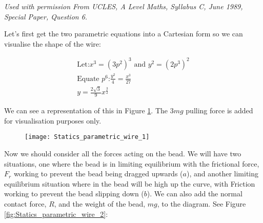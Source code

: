 
\begin{problem}[A1989MsQ6l] %
{
{\textit{Used with permission From UCLES, A Level Maths, Syllabus C, June 1989, Special Paper, Question 6.}}
{
Let's first get the two parametric equations into a Cartesian form so we can visualise the shape of the wire:

\begin{eqnarray*}
\text{Let:} x^3 = (3p^2)^3 \text{ and } y^2 = (2p^3)^2 \\
\text{Equate $p^6$:} \frac{y^2}{4} = \frac{x^3}{27} \\
y = \frac{2\sqrt{3}}{9}x^{\frac{3}{2}} 
\end{eqnarray*}

 We can see a representation of this in Figure \ref{fig:Statics_parametric_wire_1}. The $3mg$ pulling force is added for visualisation purposes only.
 
 \begin{figure}[h]
	\centering
	\texttt{[image: Statics\_parametric\_wire\_1]}
	\caption{}	
	\label{fig:Statics_parametric_wire_1}
\end{figure}

Now we should consider all the forces acting on the bead. We will have two situations, one where the bead is in limiting equilibrium with the frictional force, $F_r$ working to prevent the bead being dragged upwards ($a$), and another limiting equilibrium situation where in the bead will be high up the curve, with Friction working to prevent the bead slipping down ($b$). We can also add the normal contact force, $R$, and the weight of the bead, $mg$, to the diagram. See Figure \ref{fig:Statics_parametric_wire_2}:

}}
\end{problem}
